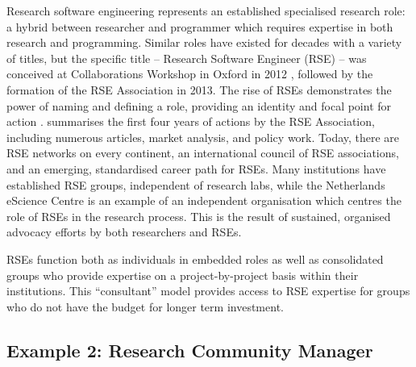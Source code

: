 \documentclass[authordate,meta,issue]{jote-new-article}
\begin{document}
Research software engineering represents an established specialised research role: a hybrid between researcher and programmer which requires expertise in both research and programming. Similar roles have existed for decades with a variety of titles, but the specific title -- Research Software Engineer (RSE) -- was conceived at Collaborations Workshop in Oxford in 2012 \parencites{Hettrick2016}, followed by the formation of the RSE Association in 2013. The rise of RSEs demonstrates the power of naming and defining a role, providing an identity and focal point for action \parencites{Sims2021}. \textcite{Hettrick2016} summarises the first four years of actions by the RSE Association, including numerous articles, market analysis, and policy work. Today, there are RSE networks on every continent, an international council of RSE associations, and an emerging, standardised career path for RSEs. Many institutions have established RSE groups, independent of research labs, while the Netherlands eScience Centre is an example of an independent organisation which centres the role of RSEs in the research process. This is the result of sustained, organised advocacy efforts by both researchers and RSEs.







RSEs function both as individuals in embedded roles as well as consolidated groups who provide expertise on a project-by-project basis within their institutions. This “consultant” model provides access to RSE expertise for groups who do not have the budget for longer term investment.



\subsection{Example 2: Research Community Manager}
\end{document}
